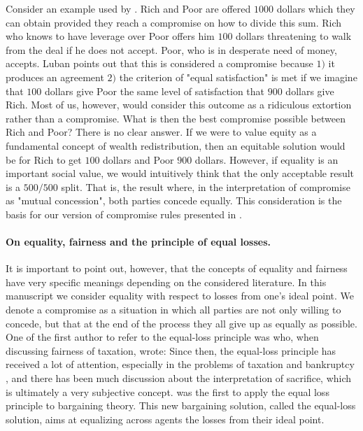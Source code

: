 Consider an example used by \cite{Luban1985}. Rich and Poor are offered $1000$ dollars which they can obtain provided they reach a compromise on how to divide this sum. 
Rich who knows to have leverage over Poor offers him $100$ dollars threatening to walk from the deal if he does not accept. Poor, who is in desperate need of money, accepts.
Luban points out that this is considered a compromise because $1)$ it produces an agreement $2)$ the criterion of "equal satisfaction" is met if we imagine that $100$ dollars give Poor the same level of satisfaction that $900$ dollars give Rich. Most of us, however, would consider this outcome as a ridiculous extortion rather than a compromise. 
What is then the best compromise possible between Rich and Poor? There is no clear answer.
If we were to value equity as a fundamental concept of wealth redistribution, then an equitable solution would be for Rich to get $100$ dollars and Poor $900$ dollars.
However, if equality is an important social value, we would intuitively think that the only acceptable result is a $500/500$ split. That is, the result where, in the interpretation of compromise as "mutual concession", both parties concede equally.
This consideration is the basis for our version of compromise rules presented in .

\paragraph{On equality, fairness and the principle of equal losses.} It is important to point out, however, that the concepts of equality and fairness have very specific meanings depending on the considered literature. 
In this manuscript we consider equality with respect to losses from one's ideal point. 
We denote a compromise as a situation in which all parties are not only willing to concede, but that at the end of the process they all give up as equally as possible. 
One of the first author to refer to the equal-loss principle was \citet[p. 396]{Mill1849} who, when discussing fairness of taxation, wrote: \textit{} 
Since then, the equal-loss principle has received a lot of attention, especially in the problems of taxation \citep{Edgeworth1897,Young1987} and bankruptcy \citep{Herrero2001, Aumann1985}, and there has been much discussion about the interpretation of sacrifice, which is ultimately a very subjective concept. \citet{Chun1988} was the first to apply the equal loss principle to bargaining theory. This new bargaining solution, called the equal-loss solution, aims at equalizing across agents the losses from their ideal point.

